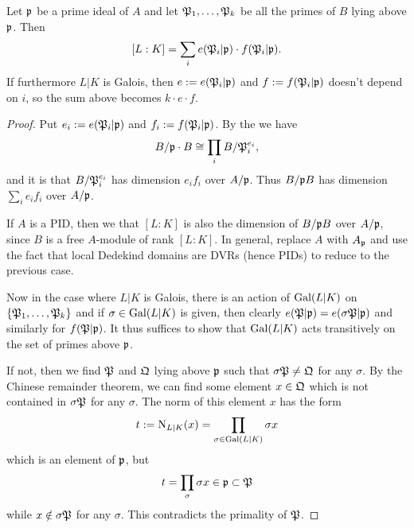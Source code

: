 \begin{lemma}\label{lemma:fundamental_equality}
  Let $\mathfrak{p}$ be a prime ideal of $A$ and let $\mathfrak{P}_{1},\ldots,\mathfrak{P}_{k}$ be all the primes of $B$ lying above $\mathfrak{p}$.
  Then
  \[ [L:K] = \sum_{i} e(\mathfrak{P}_{i}|\mathfrak{p}) \cdot f(\mathfrak{P}_{i}|\mathfrak{p}). \]
  If furthermore $L|K$ is Galois, then $e := e(\mathfrak{P}_{i}|\mathfrak{p})$ and $f := f(\mathfrak{P}_{i}|\mathfrak{p})$ doesn't depend on $i$, so the sum above becomes $k \cdot e \cdot f$.
\end{lemma}
\begin{proof}
  Put $e_{i} := e(\mathfrak{P}_{i}|\mathfrak{p})$ and $f_{i} := f(\mathfrak{P}_{i}|\mathfrak{p})$.
  By the  we have
  \[ B/\mathfrak{p} \cdot B \cong \prod_{i} B/\mathfrak{P}_{i}^{e_{i}}, \]
  and it is  that $B/\mathfrak{P}_{i}^{e_{i}}$ has dimension $e_{i} f_{i}$ over $A/\mathfrak{p}$.
  Thus $B/\mathfrak{p} B$ has dimension $\sum_{i} e_{i} f_{i}$ over $A/\mathfrak{p}$.

  If $A$ is a PID, then we  that $[L:K]$ is also the dimension of $B/\mathfrak{p} B$ over $A/\mathfrak{p}$, since $B$ is a free $A$-module of rank $[L:K]$.
  In general, replace $A$ with $A_{\mathfrak{p}}$ and use the fact that local Dedekind domains are DVRs (hence PIDs) to reduce to the previous case.

  Now in the case where $L|K$ is Galois, there is an action of $\operatorname{Gal}(L|K)$ on $\{\mathfrak{P}_{1},\ldots,\mathfrak{P}_{k}\}$ and if $\sigma \in \operatorname{Gal}(L|K)$ is given, then clearly $e(\mathfrak{P}|\mathfrak{p}) = e(\sigma\mathfrak{P}|\mathfrak{p})$ and similarly for $f(\mathfrak{P}|\mathfrak{p})$.
  It thus suffices to show that $\operatorname{Gal}(L|K)$ acts transitively on the set of primes above $\mathfrak{p}$.

  If not, then we find $\mathfrak{P}$ and $\mathfrak{Q}$ lying above $\mathfrak{p}$ such that $\sigma\mathfrak{P} \neq \mathfrak{Q}$ for any $\sigma$.
  By the Chinese remainder theorem, we can find some element $x \in \mathfrak{Q}$ which is not contained in $\sigma\mathfrak{P}$ for any $\sigma$.
  The norm of this element $x$ has the form
  \[ t := \operatorname{N}_{L|K}(x) = \prod_{\sigma \in \operatorname{Gal}(L|K)} \sigma x \]
  which is an element of $\mathfrak{p}$, but
  \[ t = \prod_{\sigma} \sigma x \in \mathfrak{p} \subset \mathfrak{P} \]
  while $x \notin \sigma \mathfrak{P}$ for any $\sigma$.
  This contradicts the primality of $\mathfrak{P}$.
\end{proof}

